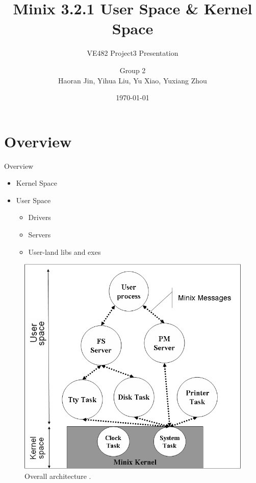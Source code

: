 \documentclass[12pt]{beamer}
\begin{document}
\title{Minix 3.2.1 User Space \& Kernel Space}
\subtitle{VE482 Project3 Presentation}
\author[Group 2]{Group 2\\Haoran Jin, Yihua Liu, Yu Xiao, Yuxiang Zhou}
\date{\today}
\begin{frame}
    \titlepage
\end{frame}
\section{Overview}
\begin{frame}{Overview}
\begin{itemize}
    \item Kernel Space
    \item User Space
    \begin{itemize}
        \item Drivers
        \item Servers
        \item User-land libs and exes
    \end{itemize}
\end{itemize}
\begin{figure}[H]
    \centering
    \includegraphics[width=0.4\linewidth]{overview.png}
    \caption{Overall architecture \cite{pessolani2011minix}.}
    \label{fig:overview}
\end{figure}
\end{frame}
\end{document}

